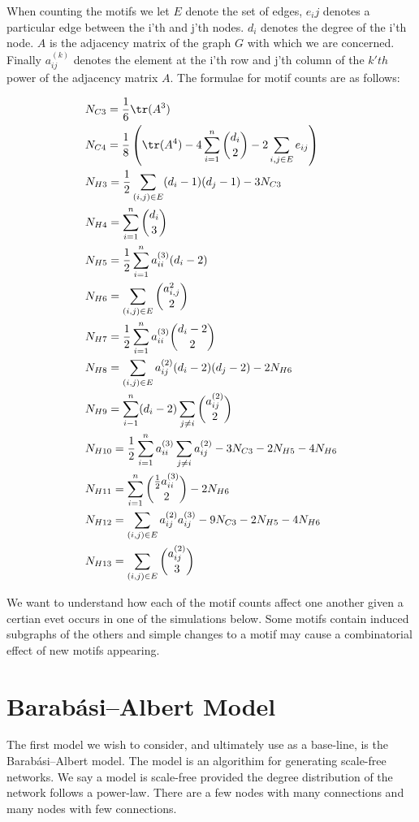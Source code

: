\vspace{3mm}

When counting the motifs we let $E$ denote the set of edges, $e_ij$ denotes a particular edge between the 
i'th and j'th nodes. $d_i$ denotes the degree of the i'th node. $A$ is the adjacency matrix of the 
graph $G$ with which we are concerned. Finally $a^{(k)}_{ij}$ denotes the element at the i'th row and j'th 
column of the $k'th$ power of the adjacency matrix $A$. The formulae for motif counts are as follows:

\newpage

\begin{align*}
    &N_{C3} = \frac{1}{6} \tr({A^3}) \\
    &N_{C4} = \frac{1}{8} \left(\tr(A^4) -4\sum^{n}_{i=1} {d_i \choose 2} - 2\sum_{i,j \in E} e_{ij} \right)\\
    &N_{H3} = \frac{1}{2}\sum_{(i,j)\in E} (d_i - 1)(d_j - 1) - 3 N_{C3} \\
    &N_{H4} = \sum^{n}_{i=1} {d_i \choose 3} \\
    &N_{H5} = \frac{1}{2} \sum^{n}_{i=1} a^{(3)}_{ii} (d_i-2)\\
    &N_{H6} = \sum_{(i,j)\in E}{a^{2}_{i,j} \choose 2 }\\
    &N_{H7} = \frac{1}{2} \sum^{n}_{i=1} a^{(3)}_{ii} {{d_i-2} \choose 2}\\
    &N_{H8} = \sum_{(i,j)\in E} a^{(2)}_{ij} (d_i-2)(d_j-2) - 2 N_{H6}\\
    &N_{H9} = \sum^{n}_{i-1}(d_i-2) \sum_{j \neq i} {a^{(2)}_{ij} \choose 2 }\\
    &N_{H10} = \frac{1}{2}\sum^{n}_{i=1}a^{(3)}_{ii} \sum_{j \neq i} a^{(2)}_{ij} - 3 N_{C3} - 2N_{H5} -4N_{H6}\\
    &N_{H11} = \sum^{n}_{i=1} {\frac{1}{2}a^{(3)}_{ii} \choose 2} - 2N_{H6}\\
    &N_{H12} = \sum_{(i,j)\in E} a^{(2)}_{ij} a^{(3)}_{ij} - 9N_{C3} -2N_{H5}-4N_{H6}\\
    &N_{H13} = \sum_{(i,j)\in E} {a^{(2)}_{ij} \choose 3}\\
\end{align*}



We want to understand how each of the motif counts affect one another given a certian evet occurs
in one of the simulations below. Some motifs contain induced subgraphs of the others and simple changes
to a motif may cause a combinatorial effect of new motifs appearing.

\chapter{Barabási–Albert Model}
The first model we wish to consider, and ultimately use as a base-line, is the Barabási–Albert model. The 
model is an algorithim for generating scale-free networks. We say a model is scale-free provided the 
degree distribution of the network follows a power-law. There are a few nodes with many connections and
many nodes with few connections. 


